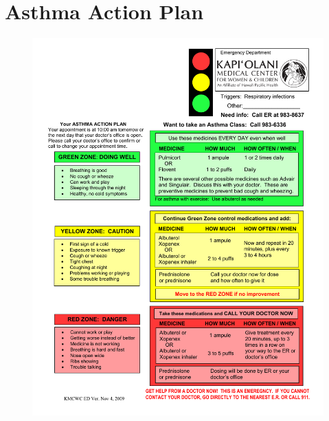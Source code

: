 \chapter{Asthma Action Plan}
\label{chp:traffic-light}
\begin{figure}[H]
	\centering
	\includegraphics[scale=0.50]{Appendices/KapiolaniEDAsthmaActionPlan.pdf}
\end{figure}

